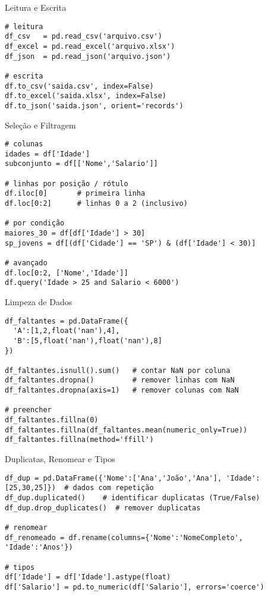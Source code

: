 \documentclass[aspectratio=169]{beamer}
\begin{document}
\begin{frame}[fragile]{Leitura e Escrita}
\begin{lstlisting}
# leitura
df_csv   = pd.read_csv('arquivo.csv')
df_excel = pd.read_excel('arquivo.xlsx')
df_json  = pd.read_json('arquivo.json')

# escrita
df.to_csv('saida.csv', index=False)
df.to_excel('saida.xlsx', index=False)
df.to_json('saida.json', orient='records')
\end{lstlisting}
\end{frame}

\begin{frame}[fragile]{Seleção e Filtragem}
\begin{lstlisting}
# colunas
idades = df['Idade']
subconjunto = df[['Nome','Salario']]

# linhas por posição / rótulo
df.iloc[0]       # primeira linha
df.loc[0:2]      # linhas 0 a 2 (inclusivo)

# por condição
maiores_30 = df[df['Idade'] > 30]
sp_jovens = df[(df['Cidade'] == 'SP') & (df['Idade'] < 30)]

# avançado
df.loc[0:2, ['Nome','Idade']]
df.query('Idade > 25 and Salario < 6000')
\end{lstlisting}
\end{frame}

\begin{frame}[fragile]{Limpeza de Dados}
\begin{lstlisting}
df_faltantes = pd.DataFrame({
  'A':[1,2,float('nan'),4],
  'B':[5,float('nan'),float('nan'),8]
})

df_faltantes.isnull().sum()   # contar NaN por coluna
df_faltantes.dropna()         # remover linhas com NaN
df_faltantes.dropna(axis=1)   # remover colunas com NaN

# preencher
df_faltantes.fillna(0)
df_faltantes.fillna(df_faltantes.mean(numeric_only=True))
df_faltantes.fillna(method='ffill')
\end{lstlisting}
\end{frame}

\begin{frame}[fragile]{Duplicatas, Renomear e Tipos}
\begin{lstlisting}
df_dup = pd.DataFrame({'Nome':['Ana','João','Ana'], 'Idade':[25,30,25]})  # dados com repetição
df_dup.duplicated()    # identificar duplicatas (True/False)
df_dup.drop_duplicates()  # remover duplicatas

# renomear
df_renomeado = df.rename(columns={'Nome':'NomeCompleto', 'Idade':'Anos'})

# tipos
df['Idade'] = df['Idade'].astype(float)
df['Salario'] = pd.to_numeric(df['Salario'], errors='coerce')
\end{lstlisting}
\end{frame}
\end{document}

